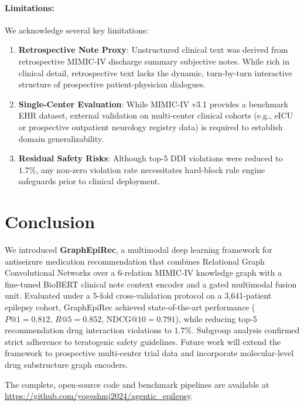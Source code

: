 \documentclass[11pt,a4paper]{article}
\begin{document}
\begin{table}[t]
\paragraph{Limitations:}
We acknowledge several key limitations:
\begin{enumerate}[leftmargin=*]
    \item \textbf{Retrospective Note Proxy}: Unstructured clinical text was derived from retrospective MIMIC-IV discharge summary subjective notes. While rich in clinical detail, retrospective text lacks the dynamic, turn-by-turn interactive structure of prospective patient-physician dialogues.
    \item \textbf{Single-Center Evaluation}: While MIMIC-IV v3.1 provides a benchmark EHR dataset, external validation on multi-center clinical cohorts (e.g., eICU or prospective outpatient neurology registry data) is required to establish domain generalizability.
    \item \textbf{Residual Safety Risks}: Although top-5 DDI violations were reduced to $1.7\%$, any non-zero violation rate necessitates hard-block rule engine safeguards prior to clinical deployment.
\end{enumerate}

\section{Conclusion}

We introduced \textbf{GraphEpiRec}, a multimodal deep learning framework for antiseizure medication recommendation that combines Relational Graph Convolutional Networks over a 6-relation MIMIC-IV knowledge graph with a fine-tuned BioBERT clinical note context encoder and a gated multimodal fusion unit. Evaluated under a 5-fold cross-validation protocol on a 3,641-patient epilepsy cohort, GraphEpiRec achieved state-of-the-art performance ($P@1=0.812$, $R@5=0.852$, $\text{NDCG}@10=0.791$), while reducing top-5 recommendation drug interaction violations to $1.7\%$. Subgroup analysis confirmed strict adherence to teratogenic safety guidelines. Future work will extend the framework to prospective multi-center trial data and incorporate molecular-level drug substructure graph encoders.

The complete, open-source code and benchmark pipelines are available at \url{https://github.com/yogeshmj2024/agentic_epilepsy}.


\end{table}
\end{document}
